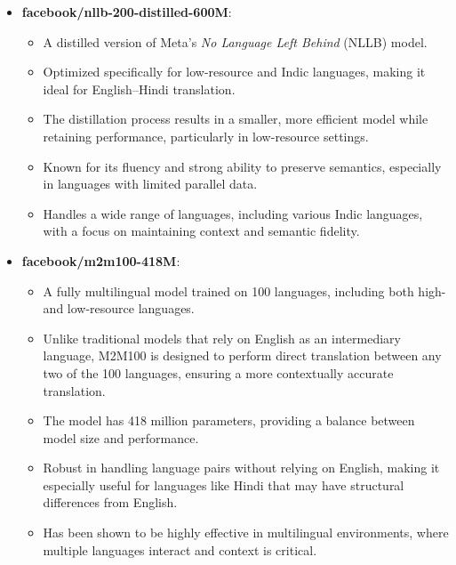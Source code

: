 \documentclass[letterpaper,11pt]{report}
\begin{document}
\begin{itemize}
    \item \textbf{facebook/nllb-200-distilled-600M}:
    \begin{itemize}
        \item A distilled version of Meta’s \textit{No Language Left Behind} (NLLB) model.
        \item Optimized specifically for low-resource and Indic languages, making it ideal for English–Hindi translation.
        \item The distillation process results in a smaller, more efficient model while retaining performance, particularly in low-resource settings.
        \item Known for its fluency and strong ability to preserve semantics, especially in languages with limited parallel data.
        \item Handles a wide range of languages, including various Indic languages, with a focus on maintaining context and semantic fidelity.
    \end{itemize}
    
    \item \textbf{facebook/m2m100-418M}:
    \begin{itemize}
        \item A fully multilingual model trained on 100 languages, including both high- and low-resource languages.
        \item Unlike traditional models that rely on English as an intermediary language, M2M100 is designed to perform direct translation between any two of the 100 languages, ensuring a more contextually accurate translation.
        \item The model has 418 million parameters, providing a balance between model size and performance.
        \item Robust in handling language pairs without relying on English, making it especially useful for languages like Hindi that may have structural differences from English.
        \item Has been shown to be highly effective in multilingual environments, where multiple languages interact and context is critical.
    \end{itemize}
    

\end{itemize}
\end{document}
